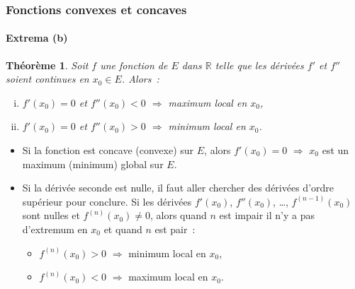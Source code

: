 \documentclass[10pt,notheorems]{beamer}
\theoremstyle{plain}
\newtheorem{theorem}{Théorème}
\theoremstyle{definition} %
\begin{document}
\begin{frame}
  \frametitle{Fonctions convexes et concaves}
  \framesubtitle{Extrema (b)}
  \hypertarget{slide_fonctions_convexes_9}{}

  \begin{theorem}
    Soit $f$ une fonction de $E$ dans $\mathbb R$ telle que les dérivées $f'$ et $f''$ soient continues en $x_0\in E$. Alors~:
    \begin{enumerate}[(i)]
    \item $f'(x_0) = 0$ et $f''(x_0)<0$ $\Rightarrow$ maximum local en $x_0$,
    \item $f'(x_0) = 0$ et $f''(x_0)>0$ $\Rightarrow$ minimum local en $x_0$.
    \end{enumerate}
  \end{theorem}

  \bigskip

  \begin{itemize}

  \item Si la fonction est concave (convexe) sur $E$, alors
    $f'(x_0)=0$ $\Rightarrow$ $x_0$ est un maximum (minimum) global
    sur $E$.\newline

  \item Si la dérivée seconde est nulle, il faut aller chercher des
    dérivées d'ordre supérieur pour conclure. Si les dérivées
    $f'(x_0)$, $f''(x_0)$, \ldots, $f^{(n-1)}(x_0)$ sont nulles et
    $f^{(n)}(x_0)\neq 0$, alors quand $n$ est impair il n'y a pas
    d'extremum en $x_0$ et quand $n$ est pair~:

    \begin{itemize}
    \item $f^{(n)}(x_0)>0$ $\Rightarrow$ minimum local en $x_0$,
    \item $f^{(n)}(x_0)<0$ $\Rightarrow$ maximum local en $x_0$.
    \end{itemize}

  \end{itemize}
\end{frame}
\end{document}
